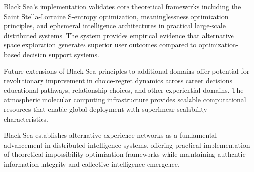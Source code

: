\documentclass[12pt,a4paper]{article}
\begin{document}
Black Sea's implementation validates core theoretical frameworks including the Saint Stella-Lorraine S-entropy optimization, meaninglessness optimization principles, and ephemeral intelligence architectures in practical large-scale distributed systems. The system provides empirical evidence that alternative space exploration generates superior user outcomes compared to optimization-based decision support systems.

Future extensions of Black Sea principles to additional domains offer potential for revolutionary improvement in choice-regret dynamics across career decisions, educational pathways, relationship choices, and other experiential domains. The atmospheric molecular computing infrastructure provides scalable computational resources that enable global deployment with superlinear scalability characteristics.

Black Sea establishes alternative experience networks as a fundamental advancement in distributed intelligence systems, offering practical implementation of theoretical impossibility optimization frameworks while maintaining authentic information integrity and collective intelligence emergence.


\end{document}

